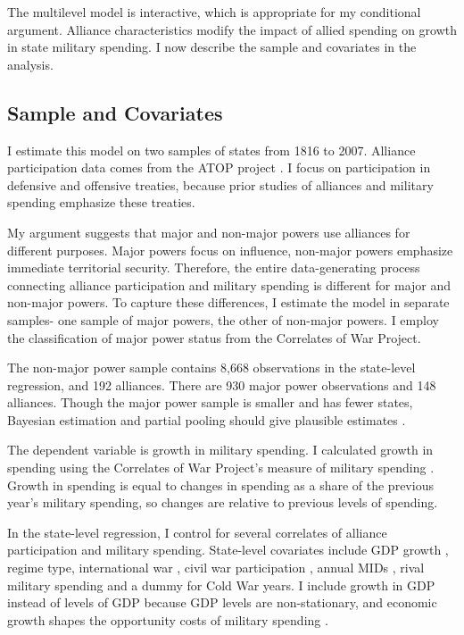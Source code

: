 \documentclass[12pt]{article}
\begin{document}
The multilevel model is interactive, which is appropriate for my conditional argument. 
Alliance characteristics modify the impact of allied spending on growth in state military spending. 
I now describe the sample and covariates in the analysis.  



\subsection{Sample and Covariates} 

I estimate this model on two samples of states from 1816 to 2007. 
Alliance participation data comes from the ATOP project \citep{Leedsetal2002}. 
I focus on participation in defensive and offensive treaties, because prior studies of alliances and military spending emphasize these treaties. 


My argument suggests that major and non-major powers use alliances for different purposes.
Major powers focus on influence, non-major powers emphasize immediate territorial security.  
Therefore, the entire data-generating process connecting alliance participation and military spending is different for major and non-major powers. 
To capture these differences, I estimate the model in separate samples- one sample of major powers, the other of non-major powers.
I employ the classification of major power status from the Correlates of War Project. 


The non-major power sample contains 8,668 observations in the state-level regression, and 192 alliances. 
There are 930 major power observations and 148 alliances. 
Though the major power sample is smaller and has fewer states, Bayesian estimation and partial pooling should give plausible estimates \citep{Stegmueller2013}. 

The dependent variable is growth in military spending.
I calculated growth in spending using the Correlates of War Project's measure of military spending \citep{SingerCINC1988}. 
Growth in spending is equal to changes in spending as a share of the previous year's military spending, so changes are relative to previous levels of spending. 


In the state-level regression, I control for several correlates of alliance participation and military spending. 
State-level covariates include GDP growth \citep{Boltetal2018}, regime type, international war \citep{Reiteretal2016}, civil war participation \citep{SarkeesWayman2010}, annual MIDs \citep{Gibleretal2016}, rival military spending \citep{ThompsonDreyer2012} and a dummy for Cold War years.
I include growth in GDP instead of levels of GDP because GDP levels are non-stationary, and economic growth shapes the opportunity costs of military spending \citep{Kimball2010, Zielinskietal2017}.
\end{document}
